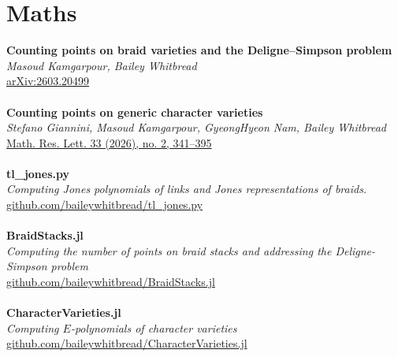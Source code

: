 \documentclass[8pt]{amsart}
\begin{document}
\section*{\LARGE Maths}
\textbf{Counting points on braid varieties and the Deligne–Simpson problem} \\
\emph{Masoud Kamgarpour, Bailey Whitbread} \\
\href{https://arxiv.org/abs/2603.20499}{arXiv:2603.20499} \\
\ \\
\textbf{Counting points on generic character varieties} \\
\emph{Stefano Giannini, Masoud Kamgarpour, GyeongHyeon Nam, Bailey Whitbread} \\
\href{https://dx.doi.org/10.4310/MRL.260612170802}{Math. Res. Lett. 33 (2026), no. 2, 341–395} \\
\ \\
\textbf{tl\_jones.py}  \\
\emph{Computing Jones polynomials of links and Jones representations of braids.}  \\
\href{https://github.com/baileywhitbread/tl_jones.py}{github.com/baileywhitbread/tl\_jones.py} \\
\ \\
\textbf{BraidStacks.jl}  \\
\emph{ Computing the number of points on braid stacks and addressing the Deligne-Simpson problem}  \\
\href{https://github.com/baileywhitbread/BraidStacks.jl}{github.com/baileywhitbread/BraidStacks.jl} \\
\ \\
\textbf{CharacterVarieties.jl}  \\
\emph{ Computing $E$-polynomials of character varieties }  \\
\href{https://github.com/baileywhitbread/CharacterVarieties.jl}{github.com/baileywhitbread/CharacterVarieties.jl} 
\end{document}
